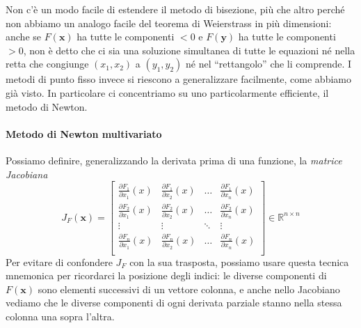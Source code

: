 \documentclass[a4paper]{report}
\theoremstyle{definiton}
\theoremstyle{remark}
\newcommand{\x}{\mathbf{x}}
\begin{document}
 Non c'è un modo facile di estendere il metodo di bisezione, più che altro perché non abbiamo un analogo facile del teorema di Weierstrass in più dimensioni: anche se $F(\mathbf{x})$ ha tutte le componenti $<0$ e $F(\mathbf{y})$ ha tutte le componenti $>0$, non è detto che ci sia una soluzione simultanea di tutte le equazioni né nella retta che congiunge $(x_1,x_2)$ a $(y_1,y_2)$ né nel ``rettangolo'' che li comprende. I metodi di punto fisso invece si riescono a generalizzare facilmente, come abbiamo già visto. In particolare ci concentriamo su uno particolarmente efficiente, il metodo di Newton.

\paragraph{Metodo di Newton multivariato}
Possiamo definire, generalizzando la derivata prima di una funzione, la \emph{matrice Jacobiana}
\[
J_F(\x) = 
\begin{bmatrix}
    \frac{\partial F_1}{\partial x_1}(x) & \frac{\partial F_1}{\partial x_2}(x) & \dots & \frac{\partial F_1}{\partial x_n}(x)\\
    \frac{\partial F_2}{\partial x_1}(x) & \frac{\partial F_2}{\partial x_2}(x) & \dots & \frac{\partial F_2}{\partial x_n}(x)\\
    \vdots & \vdots & \ddots & \vdots\\
    \frac{\partial F_n}{\partial x_1}(x) & \frac{\partial F_n}{\partial x_2}(x) & \dots & \frac{\partial F_n}{\partial x_n}(x)\\
\end{bmatrix} \in \mathbb{R}^{n\times n}
\]
Per evitare di confondere $J_F$ con la sua trasposta, possiamo usare questa tecnica mnemonica per ricordarci la posizione degli indici: le diverse componenti di $F(\x)$ sono elementi successivi di un vettore colonna, e anche nello Jacobiano vediamo che le diverse componenti di ogni derivata parziale stanno nella stessa colonna una sopra l'altra. 
\end{document}
